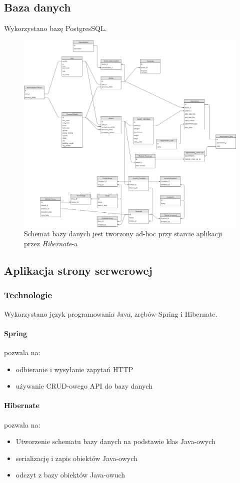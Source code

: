 \documentclass[polish,12pt]{aghthesis}
\begin{document}
\subsection{Baza danych}
Wykorzystano bazę PostgresSQL. 
\begin{figure}[H]
\caption{Schemat bazy danych jest tworzony ad-hoc przy starcie aplikacji przez \emph{Hibernate}-a}
\includegraphics[width=\textwidth]{db-schema}
\end{figure}

\subsection{Aplikacja strony serwerowej}
\subsubsection{Technologie}
Wykorzystano język programowania Java, zrębów Spring i Hibernate.
\paragraph{Spring} pozwala na:
\begin{itemize}
    \item odbieranie i wysyłanie zapytań HTTP
    \item używanie CRUD-owego API do bazy danych
\end{itemize}
\paragraph{Hibernate} pozwala na:
\begin{itemize}
    \item Utworzenie schematu bazy danych na podstawie klas Java-owych
    \item serializację i zapis obiektów Java-owych
    \item odczyt z bazy obiektów Java-owuch
\end{itemize}
\end{document}
